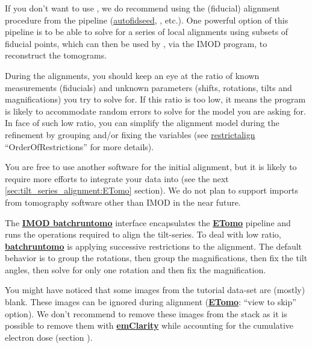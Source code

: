 If you don't want to use , we do recommend using the (fiducial) alignment procedure from the {\ETomo} pipeline (\href{https://bio3d.colorado.edu/imod/doc/man/autofidseed.html}{autofidseed}, {\tiltalign}, etc.). One powerful option of this pipeline is to be able to solve for a series of local alignments using subsets of fiducial points, which can then be used by {\emClarity}, via the IMOD {\tilt} program, to reconstruct the tomograms.

During the alignments, you should keep an eye at the ratio of known measurements (fiducials) and unknown parameters (shifts, rotations, tilts and magnifications) you try to solve for. If this ratio is too low, it means the program is likely to accommodate random errors to solve for the model you are asking for. In face of such low ratio, you can simplify the alignment model during the refinement by grouping and/or fixing the variables (see \href{https://bio3d.colorado.edu/imod/doc/man/restrictalign.html}{restrictalign} ``OrderOfRestrictions'' for more details).

You are free to use another software for the initial alignment, but it is likely to require more efforts to integrate your data into {\emClarity} (see the next \ref{sec:tilt_series_alignment:ETomo} section). We do not plan to support imports from tomography software other than IMOD in the near future.

\begin{note}The \href{https://bio3d.colorado.edu/imod/betaDoc/man/batchruntomo.html}{\textbf{IMOD batchruntomo}} interface encapsulates the \href{https://bio3d.colorado.edu/imod/doc/etomoTutorial.html}{\textbf{ETomo}} pipeline and runs the operations required to align the tilt-series. To deal with low ratio, \href{https://bio3d.colorado.edu/imod/betaDoc/man/batchruntomo.html}{\textbf{batchruntomo}} is applying successive restrictions to the alignment. The default behavior is to group the rotations, then group the magnifications, then fix the tilt angles, then solve for only one rotation and then fix the magnification.
\end{note}

\begin{tip}You might have noticed that some images from the tutorial data-set are (mostly) blank. These images can be ignored during alignment (\href{https://bio3d.colorado.edu/imod/doc/etomoTutorial.html}{\textbf{ETomo}}: ``view to skip'' option). We don't recommend to remove these images from the stack as it is possible to remove them with \href{https://github.com/bHimes/emClarity}{\textbf{emClarity}} while accounting for the cumulative electron dose (section ).
\end{tip}


